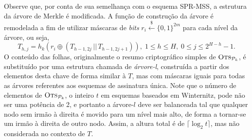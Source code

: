 \documentclass[12pt]{report}
\newcommand{\pk}{\mathcal{P}_k}
\newcommand{\concat}{\, \vert \vert \,}
\newcommand{\binwds}[1]{\{0, 1\}^{#1}}
\begin{document}
Observe que, por conta de sua semelhança com o esquema SPR-MSS, a estrutura da árvore de Merkle é modificada. A função de construção da árvore é remodelada a fim de utilizar máscaras de \emph{bits} $r_i \stackrel{\$}{\longleftarrow} \binwds{2m}$ para cada nível da árvore, ou seja,
\begin{equation}
    T_{h, j} = h_k(r_i \oplus (T_{h - 1, 2j} \concat T_{h - 1, 2j + 1})),
      \; 1 \leq h \leq H, \; 0 \leq j \leq 2^{H - h} - 1.
\end{equation}
O conteúdo das folhas, originalmente o resumo criptográfico simples de $\textsc{Ots}_{\pk{}}$, é substituído por uma estrutura chamada de \emph{árvore-l}, construída a partir dos elementos desta chave de forma similar à $T$, mas com máscaras iguais para todas as árvores referentes aos esquemas de assinatura única. Note que o número de elementos de $\textsc{Ots}_{\pk{}}$, o inteiro $t$ em esquemas baseados em Winternitz, pode não ser uma potência de 2, e portanto a árvore-$l$ deve ser balanceada tal que qualquer nodo sem irmão à direita é movido para um nível mais alto, de forma a tornar-se um irmão à direita de outro nodo. Assim, a altura total é de $\lceil \log_{2} t \rceil$, mas não considerada no contexto de $T$.
\end{document}
